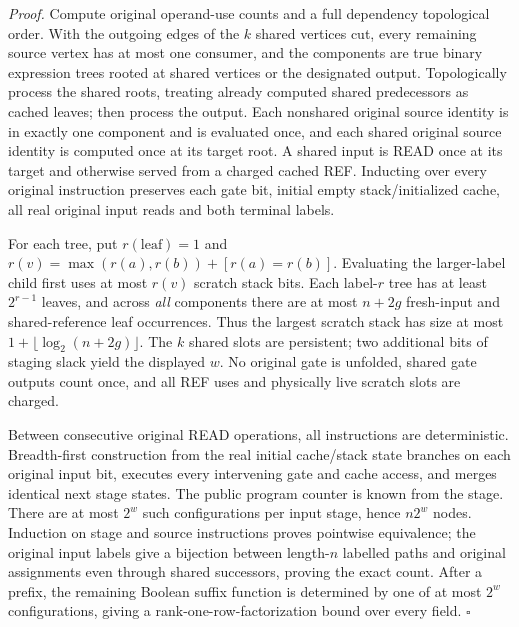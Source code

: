 \documentclass[11pt]{article}
\begin{document}
\emph{Proof.}
Compute original operand-use counts and a full dependency topological
order. With the outgoing edges of the $k$ shared vertices cut, every
remaining source vertex has at most one consumer, and the components
are true binary expression trees rooted at shared vertices or the
designated output. Topologically process the shared roots, treating
already computed shared predecessors as cached leaves; then process
the output. Each nonshared original source identity is in exactly
one component and is evaluated once, and each shared original source
identity is computed once at its target root. A shared input is READ
once at its target and otherwise served from a charged cached REF.
Inducting over every original instruction preserves each gate bit,
initial empty stack/initialized cache, all real original input reads
and both terminal labels.

For each tree, put $r(\mathrm{leaf})=1$ and
$r(v)=\max(r(a),r(b))+[r(a)=r(b)]$. Evaluating the larger-label
child first uses at most $r(v)$ scratch stack bits. Each label-$r$
tree has at least $2^{r-1}$ leaves, and across \emph{all}
components there are at most $n+2g$ fresh-input and shared-reference
leaf occurrences. Thus the largest scratch stack has size at most
$1+\lfloor\log_2(n+2g)\rfloor$. The $k$ shared slots are persistent;
two additional bits of staging slack yield the displayed $w$.
No original gate is unfolded, shared gate outputs count once, and all
REF uses and physically live scratch slots are charged.

Between consecutive original READ operations, all instructions are
deterministic. Breadth-first construction from the real initial
cache/stack state branches on each original input bit, executes every
intervening gate and cache access, and merges identical next
stage states. The public program counter is known from the stage.
There are at most $2^w$ such configurations per input stage, hence
$n2^w$ nodes. Induction on stage and source instructions proves
pointwise equivalence; the original input labels give a bijection
between length-$n$ labelled paths and original assignments even
through shared successors, proving the exact count. After a prefix,
the remaining Boolean suffix function is determined by one of at
most $2^w$ configurations, giving a rank-one-row-factorization bound
over every field. \hfill$\square$
\end{document}
